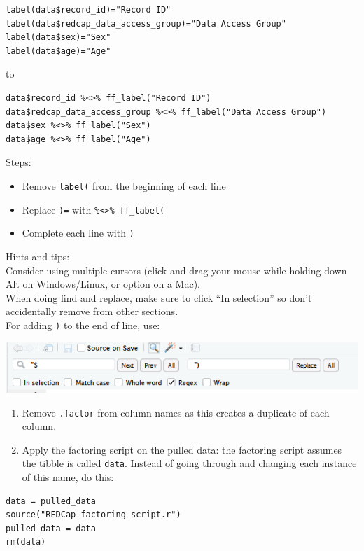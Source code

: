 \documentclass[
]{book}
\providecommand{\tightlist}{%
  \setlength{\itemsep}{0pt}\setlength{\parskip}{0pt}}
\begin{document}
\begin{verbatim}
label(data$record_id)="Record ID"
label(data$redcap_data_access_group)="Data Access Group"
label(data$sex)="Sex"
label(data$age)="Age"
\end{verbatim}

to

\begin{verbatim}
data$record_id %<>% ff_label("Record ID")
data$redcap_data_access_group %<>% ff_label("Data Access Group")
data$sex %<>% ff_label("Sex")
data$age %<>% ff_label("Age")
\end{verbatim}

Steps:

\begin{itemize}
\tightlist
\item
  Remove \texttt{label(} from the beginning of each line
\item
  Replace \texttt{)=} with \texttt{\%\textless{}\textgreater{}\%\ ff\_label(}
\item
  Complete each line with \texttt{)}
\end{itemize}

Hints and tips:\\
Consider using multiple cursors (click and drag your mouse while holding down Alt on Windows/Linux, or option on a Mac).\\
When doing find and replace, make sure to click ``In selection'' so don't accidentally remove from other sections.\\
For adding \texttt{)} to the end of line, use:

\includegraphics[width=800px]{img/regexp_end_of_line}

\begin{enumerate}
\def\labelenumi{\arabic{enumi}.}
\setcounter{enumi}{4}
\item
  Remove \texttt{.factor} from column names as this creates a duplicate of each column.
\item
  Apply the factoring script on the pulled data: the factoring script assumes the tibble is called \texttt{data}. Instead of going through and changing each instance of this name, do this:
\end{enumerate}

\begin{verbatim}
data = pulled_data
source("REDCap_factoring_script.r")
pulled_data = data
rm(data)
\end{verbatim}
\end{document}
